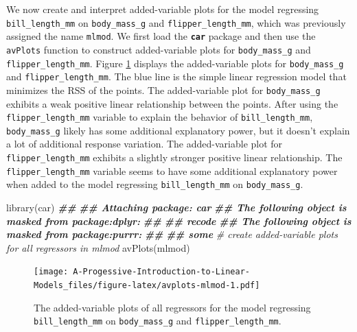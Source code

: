 \documentclass[
]{book}
\newenvironment{Shaded}{\begin{snugshade}}{\end{snugshade}}
\newcommand{\CommentTok}[1]{\textcolor[rgb]{0.56,0.35,0.01}{\textit{#1}}}
\newcommand{\DocumentationTok}[1]{\textcolor[rgb]{0.56,0.35,0.01}{\textbf{\textit{#1}}}}
\newcommand{\FunctionTok}[1]{\textcolor[rgb]{0.00,0.00,0.00}{#1}}
\newcommand{\NormalTok}[1]{#1}
\theoremstyle{definition}
\theoremstyle{definition}
\theoremstyle{definition}
\theoremstyle{definition}
\theoremstyle{remark}
\begin{document}
We now create and interpret added-variable plots for the model
regressing \texttt{bill\_length\_mm} on \texttt{body\_mass\_g} and \texttt{flipper\_length\_mm},
which was previously assigned the name \texttt{mlmod}. We first load the
\textbf{\texttt{car}} package and then use the \texttt{avPlots} function to construct
added-variable plots for \texttt{body\_mass\_g} and \texttt{flipper\_length\_mm}. Figure
\ref{fig:avplots-mlmod} displays the added-variable plots for
\texttt{body\_mass\_g} and \texttt{flipper\_length\_mm}. The blue line is the simple
linear regression model that minimizes the RSS of the points. The
added-variable plot for \texttt{body\_mass\_g} exhibits a weak positive linear
relationship between the points. After using the \texttt{flipper\_length\_mm}
variable to explain the behavior of \texttt{bill\_length\_mm}, \texttt{body\_mass\_g}
likely has some additional explanatory power, but it doesn't explain a
lot of additional response variation. The added-variable plot for
\texttt{flipper\_length\_mm} exhibits a slightly stronger positive linear
relationship. The \texttt{flipper\_length\_mm} variable seems to have some
additional explanatory power when added to the model regressing
\texttt{bill\_length\_mm} on \texttt{body\_mass\_g}.

\begin{Shaded}
\begin{Highlighting}[]
\FunctionTok{library}\NormalTok{(car)}
\DocumentationTok{\#\# }
\DocumentationTok{\#\# Attaching package: \textquotesingle{}car\textquotesingle{}}
\DocumentationTok{\#\# The following object is masked from \textquotesingle{}package:dplyr\textquotesingle{}:}
\DocumentationTok{\#\# }
\DocumentationTok{\#\#     recode}
\DocumentationTok{\#\# The following object is masked from \textquotesingle{}package:purrr\textquotesingle{}:}
\DocumentationTok{\#\# }
\DocumentationTok{\#\#     some}
\CommentTok{\# create added{-}variable plots for all regressors in mlmod}
\FunctionTok{avPlots}\NormalTok{(mlmod)}
\end{Highlighting}
\end{Shaded}

\begin{figure}
\centering
\texttt{[image: A-Progessive-Introduction-to-Linear-Models\_files/figure-latex/avplots-mlmod-1.pdf]}
\caption{\label{fig:avplots-mlmod}The added-variable plots of all regressors for the model regressing \texttt{bill\_length\_mm} on \texttt{body\_mass\_g} and \texttt{flipper\_length\_mm}.}
\end{figure}
\end{document}
